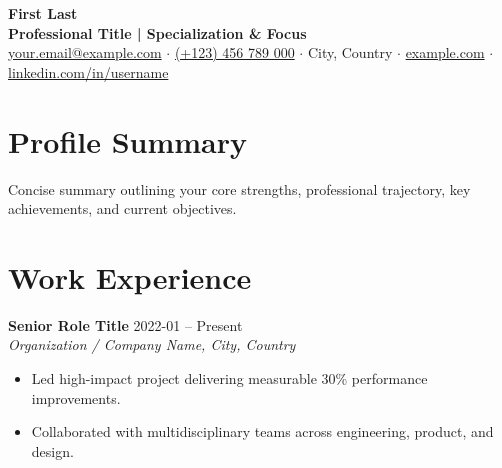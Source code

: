 \documentclass[10pt,a4paper]{article}
\begin{document}
\begin{center}
    {\color{primaryColor}\Huge\bfseries First Last}\\
    \vspace{2pt}
    {\color{darkgray}\normalsize\bfseries Professional Title | Specialization \& Focus}\\
    \vspace{4pt}
    {\small
    \href{mailto:your.email@example.com}{your.email@example.com} $\cdot$ \href{tel:+1234567890}{(+123) 456 789 000} $\cdot$ City, Country $\cdot$ \href{https://example.com}{example.com} $\cdot$ \href{https://linkedin.com/in/username}{linkedin.com/in/username}
    }
\end{center}
\vspace{-6pt}

\section{Profile Summary}
Concise summary outlining your core strengths, professional trajectory, key achievements, and current objectives.

\section{Work Experience}
\textbf{Senior Role Title} \hfill {\small 2022-01 -- Present}\\
{\textit{Organization / Company Name, City, Country}}
\begin{itemize}[leftmargin=1.5em, itemsep=1pt, topsep=2pt]
  \item Led high-impact project delivering measurable 30\% performance improvements.
  \item Collaborated with multidisciplinary teams across engineering, product, and design.
\end{itemize}
\vspace{4pt}

\end{document}
